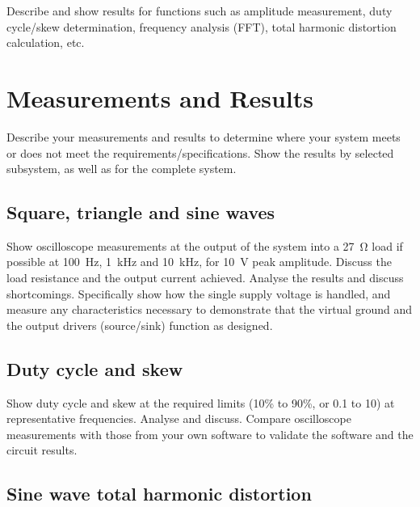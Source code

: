 \documentclass[11pt,a4paper]{article}
\begin{document}
Describe and show results for functions such as amplitude measurement, duty cycle/skew determination, frequency analysis (FFT), total harmonic distortion calculation, etc.

\newpage
\section{Measurements and Results}

Describe your measurements and results to determine where your system meets or does not meet the requirements/specifications. Show the results by selected subsystem, as well as for the complete system. 

\subsection{Square, triangle and sine waves}

Show oscilloscope measurements at the output of the system into a \SI{27}{\ohm} load if possible at \SI{100}{\hertz}, \SI{1}{\kilo\hertz} and \SI{10}{\kilo\hertz}, for \SI{10}{\volt} peak amplitude. Discuss the load resistance and the output current achieved. Analyse the results and discuss shortcomings. Specifically show how the single supply voltage is handled, and measure any characteristics necessary to demonstrate that the virtual ground and the output drivers (source/sink) function as designed.

\subsection{Duty cycle and skew}

Show duty cycle and skew at the required limits (10\% to 90\%, or 0.1 to 10) at representative frequencies. Analyse and discuss. Compare oscilloscope measurements with those from your own software to validate the software and the circuit results.

\subsection{Sine wave total harmonic distortion}
\end{document}
